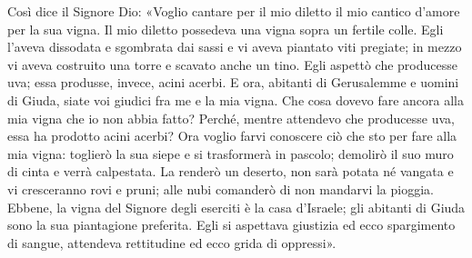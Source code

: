 Così dice il Signore Dio: «Voglio cantare per il mio diletto il mio cantico d'amore per la sua vigna. Il mio diletto possedeva una vigna sopra un fertile colle.
Egli l'aveva dissodata e sgombrata dai sassi e vi aveva piantato viti pregiate; in mezzo vi aveva costruito una torre e scavato anche un tino.
Egli aspettò che producesse uva; essa produsse, invece, acini acerbi. E ora, abitanti di Gerusalemme e uomini di Giuda, siate voi giudici fra me e la mia vigna.
Che cosa dovevo fare ancora alla mia vigna che io non abbia fatto?
Perché, mentre attendevo che producesse uva, essa ha prodotto acini acerbi?
Ora voglio farvi conoscere ciò che sto per fare alla mia vigna: toglierò la sua siepe e si trasformerà in pascolo; demolirò il suo muro di cinta e verrà calpestata.
La renderò un deserto, non sarà potata né vangata e vi cresceranno rovi e pruni; alle nubi comanderò di non mandarvi la pioggia.
Ebbene, la vigna del Signore degli eserciti è la casa d'Israele; gli abitanti di Giuda sono la sua piantagione preferita.
Egli si aspettava giustizia ed ecco spargimento di sangue, attendeva rettitudine ed ecco grida di oppressi».